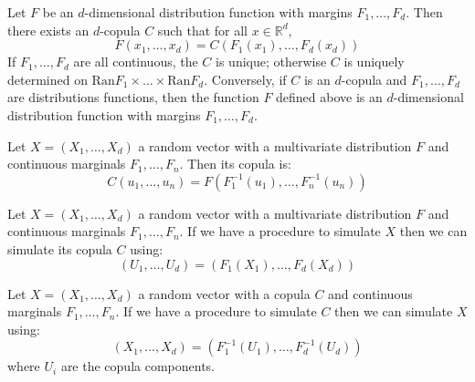 \documentclass[11pt,fleqn]{book} %
\begin{document}
\begin{theorem}
	\label{thm:sklar}
	Let $F$ be an $d$-dimensional distribution function with margins $F_1,\dots,F_d$.
	Then there exists an $d$-copula $C$ such that for all $x \in \mathbb{R}^d$,
	\begin{displaymath}
		F(x_1,\dots,x_d) = C(F_1(x_1),\dots,F_d(x_d))
	\end{displaymath}
	If $F_1,\dots,F_d$ are all continuous, the $C$ is unique; otherwise $C$ is uniquely
	determined on $\text{Ran}F_1 \times \dots \times \text{Ran}F_d$.
	Conversely, if $C$ is an $d$-copula and $F_1,\dots,F_d$ are distributions functions,
	then the function $F$ defined above is an $d$-dimensional distribution function
	with margins $F_1,\dots,F_d$.
\end{theorem}

\begin{corollary}
	\label{cor:cop1}
	Let $X=(X_1, \dots, X_d)$ a random vector with a multivariate 
	distribution $F$ and continuous marginals $F_1, \dots, F_n$. 
	Then its copula is:
	\begin{displaymath}
		C(u_1,\dots,u_n) = F(F_1^{-1}(u_1), \dots, F_n^{-1}(u_n))
	\end{displaymath}
\end{corollary}

\begin{corollary}
	\label{cor:cop2}
	Let $X=(X_1, \dots, X_d)$ a random vector with a multivariate 
	distribution $F$ and continuous marginals $F_1, \dots, F_n$.
	If we have a procedure to simulate $X$ then we can simulate 
	its copula $C$ using:
	\begin{displaymath}
		(U_1, \dots, U_d) = (F_1(X_1), \dots, F_d(X_d))
	\end{displaymath}
\end{corollary}

\begin{corollary}
	\label{cor:cop3}
	Let $X=(X_1, \dots, X_d)$ a random vector with a copula $C$
	and continuous marginals $F_1, \dots, F_n$. If we have a
	procedure to simulate $C$ then we can simulate $X$ using:
	\begin{displaymath}
		(X_1, \dots, X_d) = (F_1^{-1}(U_1), \dots, F_d^{-1}(U_d))
	\end{displaymath}
	where $U_i$ are the copula components.
\end{corollary}
\end{document}
